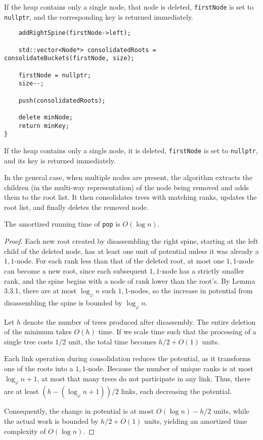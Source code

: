 If the heap contains only a single node, that node is deleted, \texttt{firstNode} is set to \texttt{nullptr}, and the corresponding key is returned immediately.

\begin{verbatim}
    addRightSpine(firstNode->left);
        
    std::vector<Node*> consolidatedRoots = consolidateBuckets(firstNode, size);

    firstNode = nullptr;
    size--;

    push(consolidatedRoots);

    delete minNode;
    return minKey;
}
\end{verbatim}

If the heap contains only a single node, it is deleted, \texttt{firstNode} is set to \texttt{nullptr}, and its key is returned immediately.

In the general case, when multiple nodes are present, the algorithm extracts the children (in the multi-way representation) of the node being removed and adds them to the root list. It then consolidates trees with matching ranks, updates the root list, and finally deletes the removed node.

\begin{lemma}
The amortized running time of \texttt{pop} is \(O(\log n)\).
\end{lemma}

\begin{proof}
Each new root created by disassembling the right spine, starting at the left child of the deleted node, has at least one unit of potential unless it was already a \(1,1\)-node. For each rank less than that of the deleted root, at most one \(1,1\)-node can become a new root, since each subsequent \(1,1\)-node has a strictly smaller rank, and the spine begins with a node of rank lower than the root’s. By Lemma 3.3.1, there are at most \(\log_\varphi n\) such \(1,1\)-nodes, so the increase in potential from disassembling the spine is bounded by \(\log_\varphi n\).

Let \(h\) denote the number of trees produced after disassembly. The entire deletion of the minimum takes \(O(h)\) time. If we scale time such that the processing of a single tree costs \(1/2\) unit, the total time becomes \(h/2 + O(1)\) units.

Each link operation during consolidation reduces the potential, as it transforms one of the roots into a \(1,1\)-node. Because the number of unique ranks is at most \(\log_\varphi n + 1\), at most that many trees do not participate in any link. Thus, there are at least \((h - (\log_\varphi n + 1))/2\) links, each decreasing the potential.

Consequently, the change in potential is at most \(O(\log n) - h/2\) units, while the actual work is bounded by \(h/2 + O(1)\) units, yielding an amortized time complexity of \(O(\log n)\).
\end{proof}


